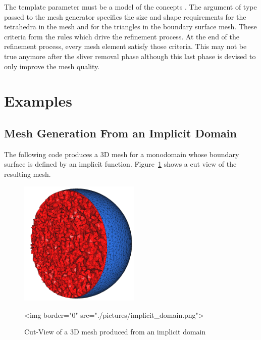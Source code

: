 
The template parameter  must be a model of the concepts
. 
The argument of
type  passed to the mesh generator specifies the
size and shape requirements for the tetrahedra in the mesh
and for the triangles in the boundary surface mesh. These criteria
form the rules which drive the refinement process.  At the end 
of the refinement process, every mesh element satisfy those criteria.
This may not be true anymore after the sliver removal phase although this
last phase is devised to only improve the mesh quality.




\section{Examples}
\label{Mesh_3_section_examples}


\subsection{Mesh Generation From an Implicit Domain}
The following code produces a 3D mesh for a monodomain whose boundary surface
is defined by an implicit
function. Figure~\ref{figure:implicit_domain} shows a cut view of the
resulting mesh.


\begin{figure}[ht]
\begin{center}
 \begin{ccTexOnly}
   \includegraphics[height=6cm]{Mesh_3/pictures/implicit_domain}
 \end{ccTexOnly}
 \begin{ccHtmlOnly}
   <img border="0" src="./pictures/implicit_domain.png">
 \end{ccHtmlOnly}
 \caption{Cut-View of a 3D mesh produced from an implicit domain}
  \label{figure:implicit_domain}
\end{center}
\end{figure}


